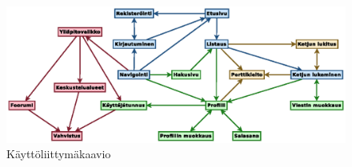 \documentclass[11pt]{article}
\begin{document}
		\newpage
		\begin{figure}[H]		
			\includegraphics[trim = 0mm 0mm 23mm -7mm, scale = 1.5, angle = 90]{kayttoliittymakaavio.eps}
			\caption{Käyttöliittymäkaavio}
		\end{figure}

	
\end{document}
